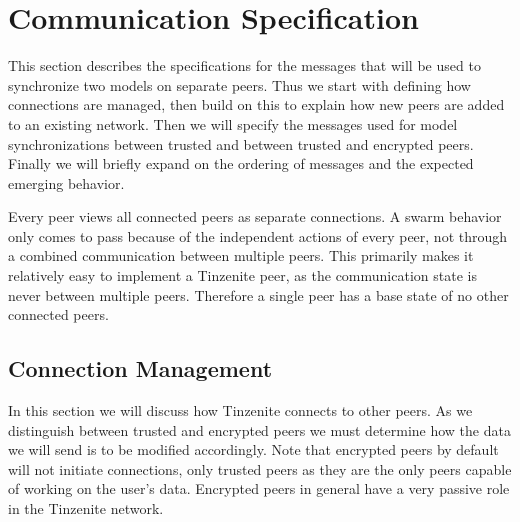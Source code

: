 \section{Communication Specification}
\label{sec:Communication Specification}

This section describes the specifications for the messages that will be used to synchronize two models on separate peers.
Thus we start with defining how connections are managed, then build on this to explain how new peers are added to an existing network.
Then we will specify the messages used for model synchronizations between trusted and between trusted and encrypted peers.
Finally we will briefly expand on the ordering of messages and the expected emerging behavior.

Every peer views all connected peers as separate connections.
A swarm behavior only comes to pass because of the independent actions of every peer, not through a combined communication between multiple peers.
This primarily makes it relatively easy to implement a Tinzenite peer, as the communication state is never between multiple peers.
Therefore a single peer has a base state of no other connected peers.

\subsection{Connection Management}
\label{sec:conn_management}

In this section we will discuss how Tinzenite connects to other peers.
As we distinguish between trusted and encrypted peers we must determine how the data we will send is to be modified accordingly.
Note that encrypted peers by default will not initiate connections, only trusted peers as they are the only peers capable of working on the user's data.
Encrypted peers in general have a very passive role in the Tinzenite network.

